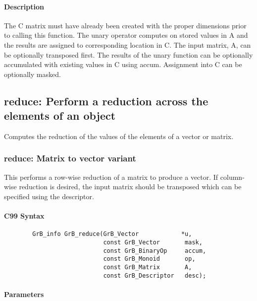 \paragraph{Description}

The {\sf C} matrix must have already been created with the proper dimensions
prior to calling this function.  The unary operator computes on stored values in {\sf A} and the results are assigned to corresponding location in {\sf C}.
The input matrix, {\sf A}, can be optionally transposed first.  The results of the unary function can be optionally accumulated with existing values in {\sf C} using accum.  Assignment into {\sf C} can be optionally masked.


\subsection{{\sf reduce}: Perform a reduction across the elements of an object}

Computes the reduction of the values of the elements of a vector or matrix.

\subsubsection{{\sf reduce}: Matrix to vector variant}

This performs a row-wise reduction of a matrix to produce a vector.  If column-wise reduction
is desired, the input matrix should be transposed which can be specified using the descriptor.

\paragraph{C99 Syntax}

\begin{verbatim}
        GrB_info GrB_reduce(GrB_Vector            *u,
                            const GrB_Vector       mask,
                            const GrB_BinaryOp     accum,
                            const GrB_Monoid       op,  
                            const GrB_Matrix       A,
                            const GrB_Descriptor   desc);
\end{verbatim}

\paragraph{Parameters}

